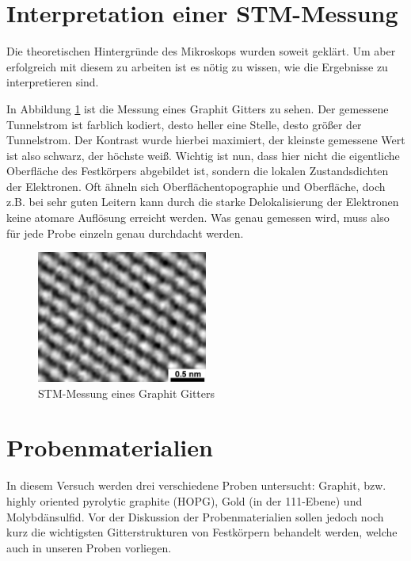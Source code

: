 \section{Interpretation einer STM-Messung}

Die theoretischen Hintergründe des Mikroskops wurden soweit geklärt. Um aber 
erfolgreich mit diesem zu arbeiten ist es nötig zu wissen, wie die Ergebnisse
zu interpretieren sind. 

In Abbildung \ref{vorb-graphit} ist die Messung eines Graphit Gitters zu sehen. 
Der gemessene Tunnelstrom ist farblich kodiert, desto heller eine Stelle, desto
größer der Tunnelstrom. Der Kontrast wurde hierbei maximiert, der kleinste 
gemessene Wert ist also schwarz, der höchste weiß. Wichtig ist nun, dass hier
nicht die eigentliche Oberfläche des Festkörpers abgebildet ist, sondern die
lokalen Zustandsdichten der Elektronen. Oft ähneln sich Oberflächentopographie 
und Oberfläche, doch z.B. bei sehr guten Leitern kann durch die starke 
Delokalisierung der Elektronen keine atomare Auflösung erreicht werden. Was 
genau gemessen wird, muss also für jede Probe einzeln genau durchdacht werden.

\begin{figure}[H]
	\centering
	\includegraphics[width=0.5\textwidth]{Abb/graphit_messung.jpg}
	\caption{STM-Messung eines Graphit Gitters \cite{rasterwiki}}
	\label{vorb-graphit}
\end{figure}

\section{Probenmaterialien}
In diesem Versuch werden drei verschiedene Proben untersucht: Graphit, bzw. highly oriented pyrolytic graphite (HOPG), Gold (in der 111-Ebene) und Molybdänsulfid. Vor der Diskussion der Probenmaterialien sollen jedoch noch kurz die wichtigsten Gitterstrukturen von Festkörpern behandelt werden, welche auch in unseren Proben vorliegen.

